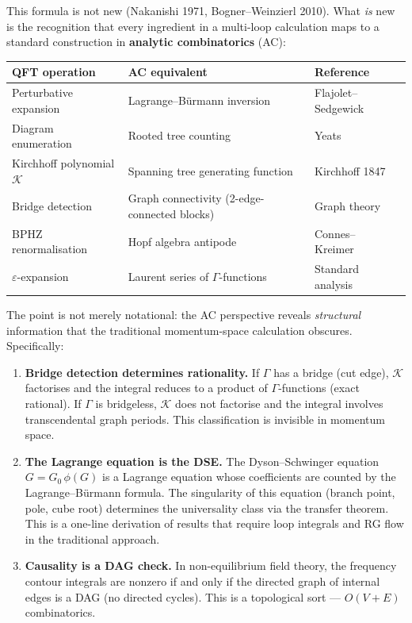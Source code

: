 \documentclass[11pt,a4paper]{article}
\theoremstyle{definition}
\newcommand{\K}{\mathcal{K}}
\begin{document}
This formula is not new (Nakanishi 1971, Bogner--Weinzierl 2010).
What \emph{is} new is the recognition that every ingredient in a
multi-loop calculation maps to a standard construction in
\textbf{analytic combinatorics} (AC):

\begin{center}
\renewcommand{\arraystretch}{1.4}
\begin{tabular}{p{4.5cm}p{4.5cm}p{4cm}}
\toprule
\textbf{QFT operation} & \textbf{AC equivalent} & \textbf{Reference} \\
\midrule
Perturbative expansion & Lagrange--B\"urmann inversion &
  Flajolet--Sedgewick~\cite{flajolet2009} \\
Diagram enumeration & Rooted tree counting &
  Yeats~\cite{yeats2017} \\
Kirchhoff polynomial $\K$ & Spanning tree generating function &
  Kirchhoff 1847 \\
Bridge detection & Graph connectivity (2-edge-connected blocks) &
  Graph theory \\
BPHZ renormalisation & Hopf algebra antipode &
  Connes--Kreimer~\cite{conneskreimer1998} \\
$\varepsilon$-expansion & Laurent series of $\Gamma$-functions &
  Standard analysis \\
\bottomrule
\end{tabular}
\end{center}

The point is not merely notational: the AC perspective reveals
\emph{structural} information that the traditional momentum-space
calculation obscures. Specifically:

\begin{enumerate}[leftmargin=2em]
\item \textbf{Bridge detection determines rationality.}
If $\Gamma$ has a bridge (cut edge), $\K$ factorises and the integral
reduces to a product of $\Gamma$-functions (exact rational). If
$\Gamma$ is bridgeless, $\K$ does not factorise and the integral
involves transcendental graph periods. This classification is
invisible in momentum space.

\item \textbf{The Lagrange equation is the DSE.}
The Dyson--Schwinger equation $G = G_0\,\phi(G)$ is a Lagrange
equation whose coefficients are counted by the Lagrange--B\"urmann
formula. The singularity of this equation (branch point, pole,
cube root) determines the universality class via the transfer
theorem. This is a one-line derivation of results that require
loop integrals and RG flow in the traditional approach.

\item \textbf{Causality is a DAG check.}
In non-equilibrium field theory, the frequency contour integrals
are nonzero if and only if the directed graph of internal edges
is a DAG (no directed cycles). This is a topological sort ---
$O(V{+}E)$ combinatorics.
\end{enumerate}
\end{document}
